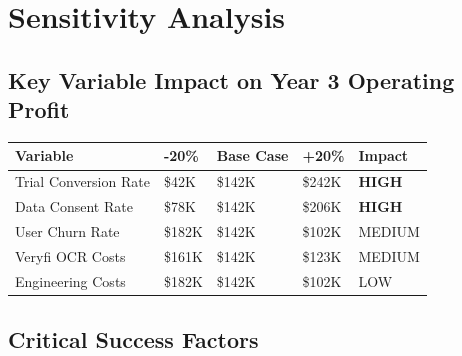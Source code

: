 \documentclass[11pt,a4paper]{article}
\begin{document}
\newpage

\section*{\textcolor{miloprimary}{Sensitivity Analysis}}

\subsection*{\textcolor{milosecondary}{Key Variable Impact on Year 3 Operating Profit}}

\begin{center}
\renewcommand{\arraystretch}{1.5}
\begin{tabular}{>{\raggedright\arraybackslash}p{4cm} >{\centering\arraybackslash}p{2.2cm} >{\centering\arraybackslash}p{2.2cm} >{\centering\arraybackslash}p{2.2cm} >{\centering\arraybackslash}p{2.2cm}}
\toprule
\rowcolor{miloprimary!15}
\textbf{Variable} & \textbf{-20\%} & \textbf{Base Case} & \textbf{+20\%} & \textbf{Impact} \\
\midrule
\rowcolor{dangerred!10}
Trial Conversion Rate & \$42K & \$142K & \$242K & \cellcolor{dangerred!20}\textbf{HIGH} \\
\rowcolor{dangerred!10}
Data Consent Rate & \$78K & \$142K & \$206K & \cellcolor{dangerred!20}\textbf{HIGH} \\
\rowcolor{warningorange!10}
User Churn Rate & \$182K & \$142K & \$102K & \cellcolor{warningorange!20}MEDIUM \\
\rowcolor{warningorange!10}
Veryfi OCR Costs & \$161K & \$142K & \$123K & \cellcolor{warningorange!20}MEDIUM \\
\rowcolor{successgreen!10}
Engineering Costs & \$182K & \$142K & \$102K & \cellcolor{successgreen!20}LOW \\
\bottomrule
\end{tabular}
\end{center}

\vspace{0.5cm}

\subsection*{\textcolor{milosecondary}{Critical Success Factors}}
\end{document}
